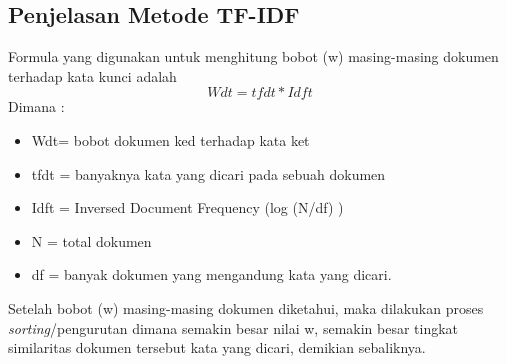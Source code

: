 \subsection{Penjelasan Metode TF-IDF}
Formula yang digunakan untuk menghitung bobot (w) masing-masing dokumen terhadap kata kunci adalah 
\begin{equation}
    Wdt = tfdt *Idft
\end{equation}
Dimana :
\begin{itemize}
    \item Wdt= bobot dokumen ke­d terhadap kata ke­t  
    \item tfdt = banyaknya kata yang dicari pada sebuah 
dokumen  
    \item Idft = Inversed Document Frequency (log 
(N/df) )
    \item N = total dokumen  
    \item df = banyak dokumen yang mengandung kata 
yang dicari.
\end{itemize}

Setelah bobot (w) masing-masing dokumen diketahui, maka dilakukan proses \textit{sorting}/pengurutan dimana semakin besar nilai w, semakin besar tingkat similaritas dokumen tersebut kata yang dicari, demikian sebaliknya.

